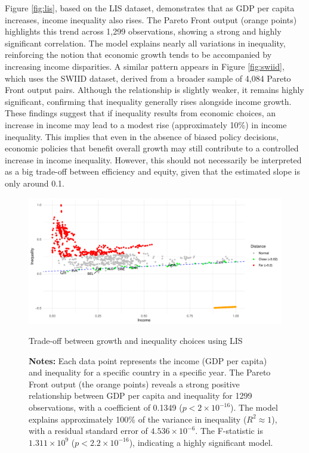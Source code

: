 Figure \ref{fig:lis}, based on the LIS dataset, demonstrates that as GDP per capita increases, income inequality also rises. The Pareto Front output (orange points) highlights this trend across 1,299 observations, showing a strong and highly significant correlation. The model explains nearly all variations in inequality, reinforcing the notion that economic growth tends to be accompanied by increasing income disparities. A similar pattern appears in Figure \ref{fig:swiid}, which uses the SWIID dataset, derived from a broader sample of 4,084 Pareto Front output pairs. Although the relationship is slightly weaker, it remains highly significant, confirming that inequality generally rises alongside income growth. These findings suggest that if inequality results from economic choices, an increase in income may lead to a modest rise (approximately 10\%) in income inequality.  This implies that even in the absence of biased policy decisions, economic policies that benefit overall growth may still contribute to a controlled increase in income inequality. However, this should not necessarily be interpreted as a big trade-off between efficiency and equity, given that the estimated slope is only around 0.1.

\begin{figure}[h!]
    \centering
    \includegraphics[width=1\linewidth]{figs/Lis.pdf}
    \caption{Trade-off between growth and inequality choices using LIS}
    \label{fig:lis}
    \captionsetup{font=footnotesize}
    \caption*{\textbf{Notes:} Each data point represents the income (GDP per capita) and inequality for a specific country in a specific year.  The Pareto Front output (the orange points) reveals a strong positive relationship between GDP per capita and inequality for 1299 observations, with a coefficient of 0.1349 (\( p < 2 \times 10^{-16} \)). The model explains approximately 100\% of the variance in inequality (\( R^2 \approx 1 \)), with a residual standard error of \( 4.536 \times 10^{-6} \). The F-statistic is \( 1.311 \times 10^9 \) (\( p < 2.2 \times 10^{-16} \)), indicating a highly significant model.}
    \label{fig:trade_off}
\end{figure}


